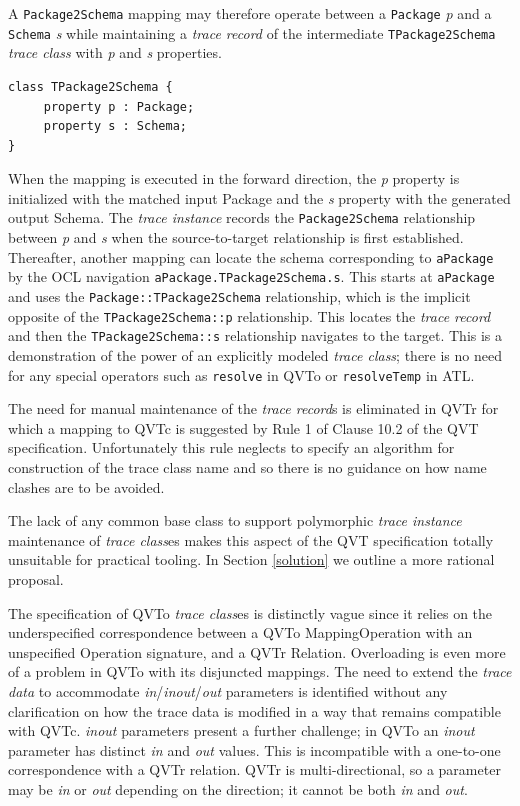 \documentclass[runningheads,a4paper]{llncs}
\begin{document}
A \verb|Package2Schema| mapping may therefore operate between a \verb|Package| \emph{p} and a \verb|Schema| \emph{s} while maintaining a \emph{trace record} of the intermediate \verb|TPackage2Schema| \emph{trace class} with \emph{p} and \emph{s} properties.
 
\begin{verbatim}
class TPackage2Schema {
     property p : Package;
     property s : Schema;
}
\end{verbatim}

When the mapping is executed in the forward direction, the \emph{p} property is initialized with the matched input Package and the \emph{s} property with the generated output Schema. The \emph{trace instance} records the \verb|Package2Schema| relationship between \emph{p} and \emph{s} when the source-to-target relationship is first established. Thereafter, another mapping can locate the schema corresponding to \verb|aPackage| by the OCL navigation \verb|aPackage.TPackage2Schema.s|. This starts at \verb|aPackage| and uses the \verb|Package::TPackage2Schema| relationship, which is the implicit opposite of the \verb|TPackage2Schema::p| relationship. This locates the \emph{trace record} and then the \verb|TPackage2Schema::s| relationship navigates to the target. This is a demonstration of the power of an explicitly modeled \emph{trace class}; there is no need for any special operators such as \verb|resolve| in QVTo or \verb|resolveTemp| in ATL.

The need for manual maintenance of the \emph{trace record}s is eliminated in QVTr for which a mapping to QVTc is suggested by Rule 1 of Clause 10.2 of the QVT specification. Unfortunately this rule neglects to specify an algorithm for construction of the trace class name and so there is no guidance on how name clashes are to be avoided.

The lack of any common base class to support polymorphic \emph{trace instance} maintenance of \emph{trace class}es  makes this aspect of the QVT specification totally unsuitable for practical tooling. In Section \ref{solution} we outline a more rational proposal.

The specification of QVTo \emph{trace class}es is distinctly vague since it relies on the underspecified correspondence between a QVTo MappingOperation with an unspecified Operation signature, and a QVTr Relation. Overloading is even more of a problem in QVTo with its disjuncted mappings. The need to extend the \emph{trace data} to accommodate \emph{in}/\emph{inout}/\emph{out} parameters is identified without any clarification on how the trace data is modified in a way that remains compatible with QVTc. \emph{inout} parameters present a further challenge; in QVTo an \emph{inout} parameter has distinct \emph{in} and \emph{out} values. This is incompatible with a one-to-one correspondence with a QVTr relation. QVTr is multi-directional, so a parameter may be \emph{in} or \emph{out} depending on the direction; it cannot be both \emph{in} and \emph{out}.
\end{document}
